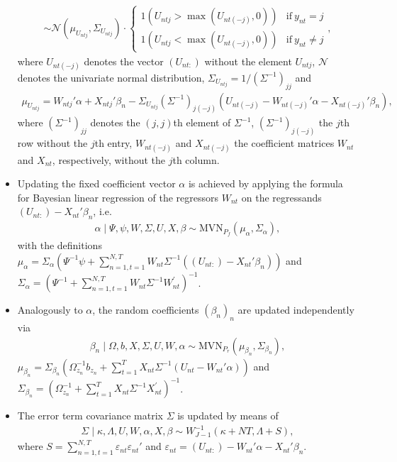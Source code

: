 \documentclass[article]{jss}
\begin{document}
\begin{itemize}
\begin{align*}
  \sim \mathcal{N}(\mu_{U_{ntj}},\Sigma_{U_{ntj}}) \cdot \begin{cases}
  1(U_{ntj}>\max(U_{nt(-j)},0) ) & \text{if}~ y_{nt}=j\\
  1(U_{ntj}<\max(U_{nt(-j)},0) ) & \text{if}~ y_{nt}\neq j
  \end{cases},
  \end{align*}
  where $U_{nt(-j)}$ denotes the vector $(U_{nt:})$ without the element $U_{ntj}$, $\mathcal{N}$ denotes the univariate normal distribution, $\Sigma_{U_{ntj}} = 1/(\Sigma^{-1})_{jj}$ and
  \begin{align*}
  \mu_{U_{ntj}} = W_{ntj}'\alpha + X_{ntj}'\beta_n - \Sigma_{U_{ntj}} (\Sigma^{-1})_{j(-j)}   (U_{nt(-j)} - W_{nt(-j)}'\alpha - X_{nt(-j)}' \beta_n ),
  \end{align*}
  where $(\Sigma^{-1})_{jj}$ denotes the $(j,j)$th element of $\Sigma^{-1}$, $(\Sigma^{-1})_{j(-j)}$ the $j$th row without the $j$th entry, $W_{nt(-j)}$ and $X_{nt(-j)}$ the coefficient matrices $W_{nt}$ and $X_{nt}$, respectively, without the $j$th column.
  \item Updating the fixed coefficient vector $\alpha$ is achieved by applying the formula for Bayesian linear regression of the regressors $W_{nt}$ on the regressands $(U_{nt:})-X_{nt}'\beta_n$, i.e.
  \begin{align*}
  \alpha \mid \Psi,\psi,W,\Sigma,U,X,\beta \sim \text{MVN}_{P_f}(\mu_\alpha,\Sigma_\alpha),
  \end{align*}
  with the definitions $\mu_\alpha = \Sigma_\alpha (\Psi^{-1}\psi + \sum_{n=1,t=1}^{N,T} W_{nt} \Sigma^{-1} ((U_{nt:})-X_{nt}'\beta_n) )$ and $\Sigma_\alpha = (\Psi^{-1} + \sum_{n=1,t=1}^{N,T} W_{nt}\Sigma^{-1} W_{nt}^{'} )^{-1}$.
  \item Analogously to $\alpha$, the random coefficients $(\beta_n)_n$ are updated independently via
  \begin{align*}
  \beta_n \mid \Omega,b,X,\Sigma,U,W,\alpha \sim \text{MVN}_{P_r}(\mu_{\beta_n},\Sigma_{\beta_n}),
  \end{align*}
  $\mu_{\beta_n} = \Sigma_{\beta_n} (\Omega_{z_n}^{-1}b_{z_n} + \sum_{t=1}^{T} X_{nt} \Sigma^{-1} (U_{nt}-W_{nt}'\alpha) )$ and $\Sigma_{\beta_n} = (\Omega_{z_n}^{-1} + \sum_{t=1}^{T} X_{nt}\Sigma^{-1} X_{nt}^{'} )^{-1}$.
    \item The error term covariance matrix $\Sigma$ is updated by means of
  \begin{align*}
  \Sigma \mid \kappa,\Lambda,U,W,\alpha,X,\beta \sim W^{-1}_{J-1}(\kappa+NT,\Lambda+S),
  \end{align*}
  where $S = \sum_{n=1,t=1}^{N,T} \varepsilon_{nt} \varepsilon_{nt}'$ and $\varepsilon_{nt} = (U_{nt:}) - W_{nt}'\alpha - X_{nt}'\beta_n$.
\end{itemize}
\end{document}
